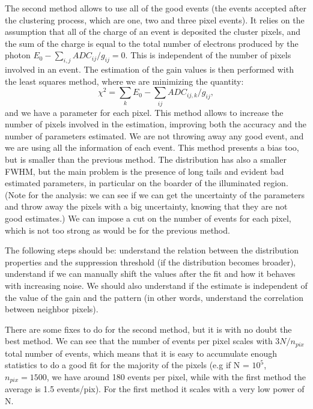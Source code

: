 The second method allows to use all of the good events (the events accepted after the clustering process, which are one, two and three pixel events). It relies on the assumption that all of the charge of an event is deposited the cluster pixels, and the sum of the charge is equal to the total number of electrons produced by the photon $E_0 - \sum_{i,j} ADC_{ij}/g_{ij}  = 0$. This is independent of the number of pixels involved in an event. The estimation of the gain values is then performed with the least squares method, where we are minimizing the quantity:
\begin{equation}
    \chi^2 = \sum_k E_0 - \sum_{ij}ADC_{ij,k}/g_{ij},
\end{equation}
and we have a parameter for each pixel.
This method allows to increase the number of pixels involved in the estimation, improving both the accuracy and the number of parameters estimated. We are not throwing away any good event, and we are using all the information of each event.
This method presents a bias too, but is smaller than the previous method. The distribution has also a smaller FWHM, but the main problem is the presence of long tails and evident bad estimated parameters, in particular on the boarder of the illuminated region. (Note for the analysis: we can see if we can get the uncertainty of the parameters and throw away the pixels with a big uncertainty, knowing that they are not good estimates.) We can impose a cut on the number of events for each pixel, which is not too strong as would be for the previous method. 

The following steps should be: understand the relation between the distribution properties and the suppression threshold (if the distribution becomes broader), understand if we can manually shift the values after the fit and how it behaves with increasing noise. We should also understand if the estimate is independent of the value of the gain and the pattern (in other words, understand the correlation between neighbor pixels).

There are some fixes to do for the second method, but it is with no doubt the best method. We can see that the number of events per pixel scales with $3N/n_{pix}$ total number of events, which means that it is easy to accumulate enough statistics to do a good fit for the majority of the pixels (e.g if N = $10^5$, $n_{pix} =1500$, we have around 180 events per pixel, while with the first method the average is 1.5 events/pix). For the first method it scales with a very low power of N.

